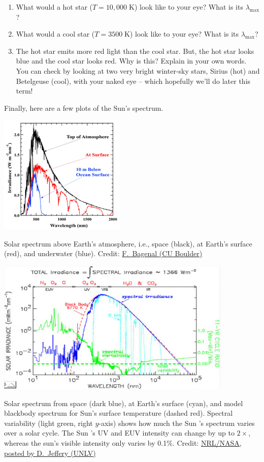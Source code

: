 \documentclass[11pt]{article}%
\newcommand{\SPACE}{\vspace{3em}}
\newcommand*{\unit}[1]{\;\mathrm{#1}}  %
\begin{document}
\begin{enumerate}
    \item What would a hot star ($T=10,000\unit{K}$) look like to your eye? What is its $\lambda_\mathrm{max}$?\SPACE
    \item What would a cool star ($T=3500\unit{K}$) look like to your eye?  What is its $\lambda_\mathrm{max}$?\SPACE
    \item The hot star emits more red light than the cool star. But, the hot star looks blue and the cool star looks red. Why is this? Explain in your own words. {\small You can check by looking at two very bright winter-sky stars, Sirius (hot) and Betelgeuse (cool), with your naked eye -- which hopefully we'll do later this term!}\SPACE
\end{enumerate}

Finally, here are a few plots of the Sun's spectrum.
\begin{center}
    \includegraphics[width=0.45\textwidth]{SolarSpectrum2.jpg} \\
\end{center}
{\small
Solar spectrum above Earth's atmosphere, i.e., space (black), at Earth's surface
(red), and underwater (blue).
Credit: \href{http://lasp.colorado.edu/~bagenal/3720/CLASS4/4Sunlight.html}{F.~Bagenal (CU Boulder)}
}
\begin{center}
    \includegraphics[width=0.85\textwidth]{solar_spectrum_loglog.jpg} \\
\end{center}
{\small
Solar spectrum from space (dark blue), at Earth's surface (cyan), and model
blackbody spectrum for Sun's surface temperature (dashed red).
Spectral variability (light green, right $y$-axis) shows
how much the Sun 's spectrum varies over a solar cycle.
The Sun 's UV and EUV intensity can change by up to $2\times$, whereas the
sun's visible intensity only varies by 0.1\%.
Credit: \href{http://www.physics.unlv.edu/~jeffery/astro/sun/solar_spectrum_graph_2.html}{NRL/NASA, posted by D.~Jeffery (UNLV)}
}
\end{document}
